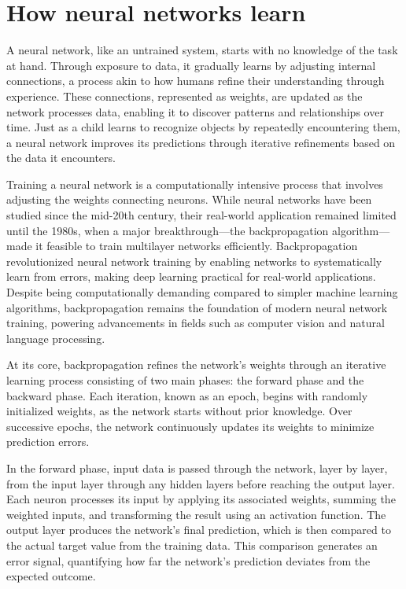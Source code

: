 \documentclass[
  11pt,
]{book}
\theoremstyle{definition}
\theoremstyle{definition}
\theoremstyle{definition}
\theoremstyle{definition}
\theoremstyle{remark}
\begin{document}
\section{How neural networks learn}\label{how-neural-networks-learn}

A neural network, like an untrained system, starts with no knowledge of the task at hand. Through exposure to data, it gradually learns by adjusting internal connections, a process akin to how humans refine their understanding through experience. These connections, represented as weights, are updated as the network processes data, enabling it to discover patterns and relationships over time. Just as a child learns to recognize objects by repeatedly encountering them, a neural network improves its predictions through iterative refinements based on the data it encounters.

Training a neural network is a computationally intensive process that involves adjusting the weights connecting neurons. While neural networks have been studied since the mid-20th century, their real-world application remained limited until the 1980s, when a major breakthrough---the backpropagation algorithm---made it feasible to train multilayer networks efficiently. Backpropagation revolutionized neural network training by enabling networks to systematically learn from errors, making deep learning practical for real-world applications. Despite being computationally demanding compared to simpler machine learning algorithms, backpropagation remains the foundation of modern neural network training, powering advancements in fields such as computer vision and natural language processing.

At its core, backpropagation refines the network's weights through an iterative learning process consisting of two main phases: the forward phase and the backward phase. Each iteration, known as an epoch, begins with randomly initialized weights, as the network starts without prior knowledge. Over successive epochs, the network continuously updates its weights to minimize prediction errors.

In the forward phase, input data is passed through the network, layer by layer, from the input layer through any hidden layers before reaching the output layer. Each neuron processes its input by applying its associated weights, summing the weighted inputs, and transforming the result using an activation function. The output layer produces the network's final prediction, which is then compared to the actual target value from the training data. This comparison generates an error signal, quantifying how far the network's prediction deviates from the expected outcome.
\end{document}
